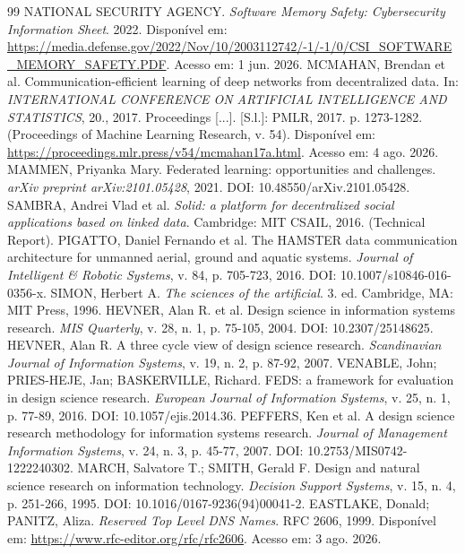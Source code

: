 \begin{thebibliography}{99}
 NATIONAL SECURITY AGENCY. \textit{Software Memory Safety: Cybersecurity Information Sheet}. 2022. Disponível em: \url{https://media.defense.gov/2022/Nov/10/2003112742/-1/-1/0/CSI_SOFTWARE_MEMORY_SAFETY.PDF}. Acesso em: 1 jun. 2026.
 MCMAHAN, Brendan et al. Communication-efficient learning of deep networks from decentralized data. In: \textit{INTERNATIONAL CONFERENCE ON ARTIFICIAL INTELLIGENCE AND STATISTICS}, 20., 2017. Proceedings [...]. [S.l.]: PMLR, 2017. p. 1273-1282. (Proceedings of Machine Learning Research, v. 54). Disponível em: \url{https://proceedings.mlr.press/v54/mcmahan17a.html}. Acesso em: 4 ago. 2026.
 MAMMEN, Priyanka Mary. Federated learning: opportunities and challenges. \textit{arXiv preprint arXiv:2101.05428}, 2021. DOI: 10.48550/arXiv.2101.05428.
 SAMBRA, Andrei Vlad et al. \textit{Solid: a platform for decentralized social applications based on linked data}. Cambridge: MIT CSAIL, 2016. (Technical Report).
 PIGATTO, Daniel Fernando et al. The HAMSTER data communication architecture for unmanned aerial, ground and aquatic systems. \textit{Journal of Intelligent \& Robotic Systems}, v. 84, p. 705-723, 2016. DOI: 10.1007/s10846-016-0356-x.
 SIMON, Herbert A. \textit{The sciences of the artificial}. 3. ed. Cambridge, MA: MIT Press, 1996.
 HEVNER, Alan R. et al. Design science in information systems research. \textit{MIS Quarterly}, v. 28, n. 1, p. 75-105, 2004. DOI: 10.2307/25148625.
 HEVNER, Alan R. A three cycle view of design science research. \textit{Scandinavian Journal of Information Systems}, v. 19, n. 2, p. 87-92, 2007.
 VENABLE, John; PRIES-HEJE, Jan; BASKERVILLE, Richard. FEDS: a framework for evaluation in design science research. \textit{European Journal of Information Systems}, v. 25, n. 1, p. 77-89, 2016. DOI: 10.1057/ejis.2014.36.
 PEFFERS, Ken et al. A design science research methodology for information systems research. \textit{Journal of Management Information Systems}, v. 24, n. 3, p. 45-77, 2007. DOI: 10.2753/MIS0742-1222240302.
 MARCH, Salvatore T.; SMITH, Gerald F. Design and natural science research on information technology. \textit{Decision Support Systems}, v. 15, n. 4, p. 251-266, 1995. DOI: 10.1016/0167-9236(94)00041-2.
 EASTLAKE, Donald; PANITZ, Aliza. \textit{Reserved Top Level DNS Names}. RFC 2606, 1999. Disponível em: \url{https://www.rfc-editor.org/rfc/rfc2606}. Acesso em: 3 ago. 2026.

\end{thebibliography}
